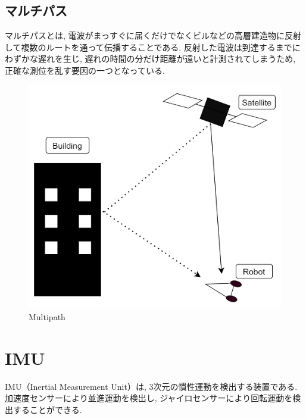 \subsection{マルチパス}
マルチパスとは, 電波がまっすぐに届くだけでなくビルなどの高層建造物に反射して複数のルートを通って伝播することである.
反射した電波は到達するまでにわずかな遅れを生じ, 遅れの時間の分だけ距離が遠いと計測されてしまうため, 正確な測位を乱す要因の一つとなっている.

\begin{figure}[H]
  \centering
 \includegraphics[keepaspectratio, scale=0.4]
      {images/multipath.png}
 \caption{Multipath}
 \label{fig:multipath}
\end{figure}

\section{IMU}
IMU（Inertial Measurement Unit）は, 
3次元の慣性運動を検出する装置である. 
加速度センサーにより並進運動を検出し, 
ジャイロセンサーにより回転運動を検出することができる.

\newpage